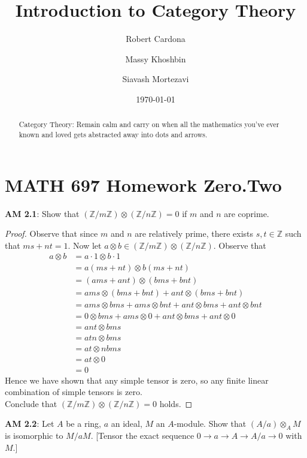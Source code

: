 \documentclass[8pt]{amsart}
\theoremstyle{plain}%
\theoremstyle{definition}
\theoremstyle{remark}
\numberwithin{equation}{section}
\newcommand{\Z}{\mathbb{Z}}
\begin{document}
\title[MATH 697]{Introduction to Category Theory}


\author{
	Robert Cardona %
	\and
	Massy Khoshbin %
	\and
	Siavash Mortezavi %
}


\address{Department of Mathematics \\ California State University Long Beach}

\date{\today}

\begin{abstract}
Category Theory: Remain calm and carry on when all the mathematics you've ever known and loved gets abstracted away into dots and arrows.
\end{abstract}

\maketitle

\setcounter{section}{-1}
\section{MATH 697 Homework Zero.Two}


\textbf{ AM 2.1}: Show that $(\Z/m\Z) \otimes (\Z/n\Z) = 0$ if $m$ and $n$ are coprime.
	\begin{proof}
		Observe that since $m$ and $n$ are relatively prime, there exists $s, t \in \Z$ such that $ms + nt = 1$. Now let $a \otimes b \in (\Z/m\Z) \otimes (\Z/n\Z)$. Observe that
		\begin{align*}
			a \otimes b &= a \cdot 1 \otimes b \cdot 1\\
			&= a (ms + nt) \otimes b (ms + nt)\\
			&= (ams + ant) \otimes (bms + bnt)\\
			&= ams \otimes (bms + bnt) + ant \otimes (bms + bnt)\\
			&= ams \otimes bms + ams \otimes bnt + ant \otimes bms + ant \otimes bnt\\
			&= 0 \otimes bms + ams \otimes 0 + ant \otimes bms + ant \otimes 0\\
			&= ant \otimes bms\\
			&= atn \otimes bms\\
			&= at \otimes nbms\\
			&= at \otimes 0\\
			&= 0
		\end{align*}
		Hence we have shown that any simple tensor is zero, so any finite linear combination of simple tensors is zero.\\

		Conclude that  $(\Z/m\Z) \otimes (\Z/n\Z) = 0$ holds.
	\end{proof}

\textbf{ AM 2.2}: Let $A$ be a ring, $a$ an ideal, $M$ an $A$-module. Show that $(A/a) \otimes_AM$ is isomorphic to $M/aM$. [Tensor the exact sequence $0 \longrightarrow a \longrightarrow A \longrightarrow A/a \longrightarrow 0$ with $M$.]
\end{document}

